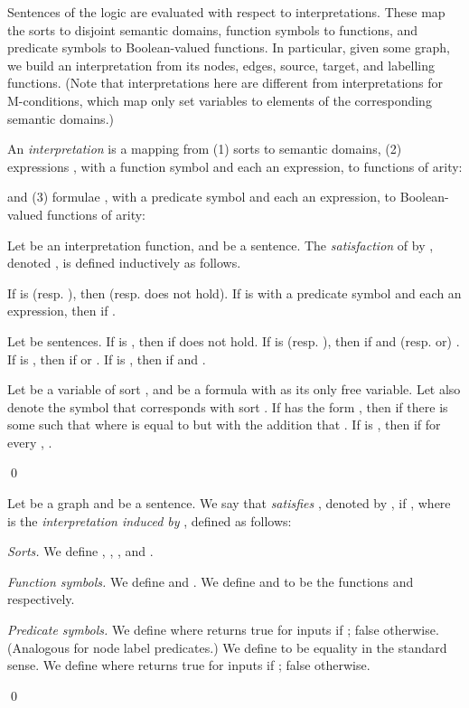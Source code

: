 \documentclass{llncs}
\begin{document}
	Sentences of the logic are evaluated with respect to interpretations. These map the sorts to disjoint semantic domains, function symbols to functions, and predicate symbols to Boolean-valued functions. In particular, given some graph, we build an interpretation from its nodes, edges, source, target, and labelling functions. (Note that interpretations here are different from interpretations for M-conditions, which map only set variables to elements of the corresponding semantic domains.)


	\begin{definition}\label{defn:app:graph_structure}\label{defn:app:interpretation_function}\label{defn:app:satisfaction_structures}\rm
		An \emph{interpretation}  is a mapping from (1) sorts to semantic domains, (2) expressions , with  a function symbol and each  an expression, to functions of arity:
	

	\noindent and (3) formulae , with  a predicate symbol and each  an expression, to Boolean-valued functions of arity:
	


		Let  be an interpretation function, and  be a sentence. The \emph{satisfaction} of  by , denoted , is defined inductively as follows.

		If  is  (resp. ), then  (resp.  does not hold). If  is  with  a predicate symbol and each  an expression, then  if .

		Let  be sentences. If  is , then  if  does not hold. If  is  (resp. ), then  if  and (resp. or) . If  is , then  if  or . If  is , then  if  and .

		Let  be a variable of sort , and  be a formula with  as its only free variable. Let also  denote the symbol that corresponds with sort . If  has the form , then  if there is some  such that  where  is equal to  but with the addition that . If  is , then  if for every , .

	\qed
	\end{definition}


	\begin{definition}\label{defn:interpretation_function}\label{defn:satisfaction_graphs}\rm
		Let  be a graph and  be a sentence. We say that  \emph{satisfies} , denoted by , if , where  is the \emph{interpretation induced by }, defined as follows:


		\emph{Sorts.} We define , , , and  .
		
		\emph{Function symbols.} We define  and . We define  and  to be the functions  and  respectively.

		\emph{Predicate symbols.} We define  where  returns true for inputs  if ; false otherwise. (Analogous for node label predicates.) We define  to be equality in the standard sense. We define  where  returns true for inputs  if ; false otherwise.

	\qed
	\end{definition}
	
\end{document}
